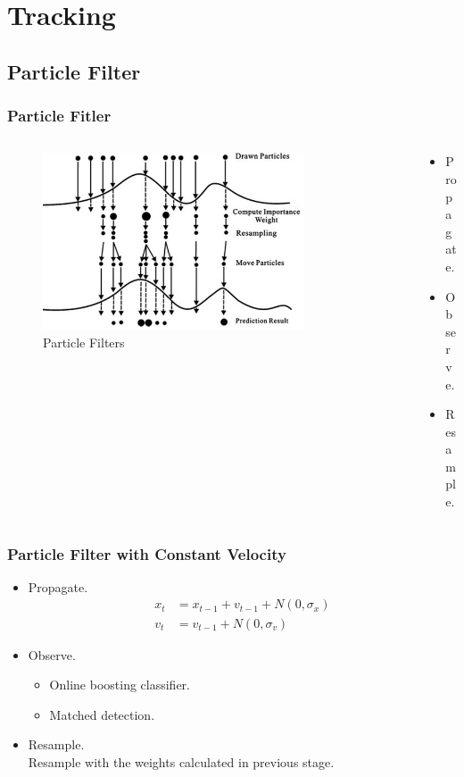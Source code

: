 \documentclass{beamer}
\begin{document}
\section{Tracking}
\subsection{Particle Filter}
\begin{frame}
	\frametitle{Particle Fitler}
	\begin{columns}[T]
		\begin{column}{0.7\textwidth}
		\begin{figure}
		\begin{center}
			\includegraphics[width=0.8\textwidth]{images/particlefilter.png}
			\caption{Particle Filters}
		\end{center}
		\end{figure}
		\end{column}
		\begin{column}{0.3\textwidth}
			\begin{itemize}
				\item Propagate.
				\item Observe.
				\item Resample.
			\end{itemize}
		\end{column}
	\end{columns}
\end{frame}

\begin{frame}
	\frametitle{Particle Filter with Constant Velocity}
	\begin{itemize}
		\item Propagate.
		\begin{align}
		x_{t}&=x_{t-1}+v_{t-1}+N(0, \sigma_x)\\
		v_{t}&=v_{t-1}+N(0, \sigma_v)
		\end{align}

		\item Observe.
		\begin{itemize}
		\item Online boosting classifier.
		\item Matched detection.
		\end{itemize}
		\item Resample.\\
		Resample with the weights calculated in previous stage.
	\end{itemize}
\end{frame}
\end{document}
